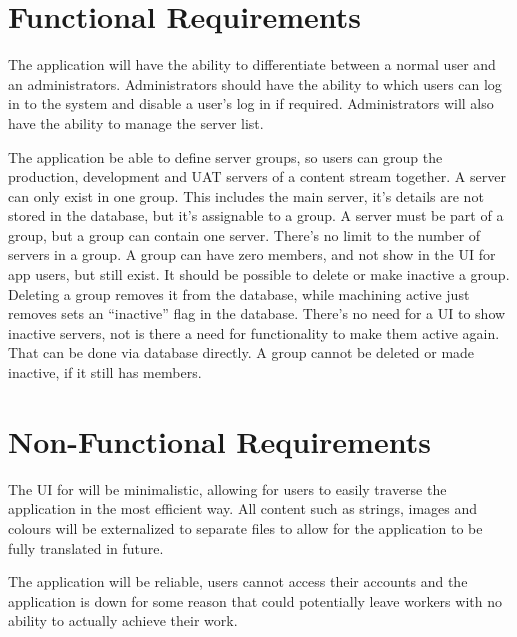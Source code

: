 \section{Functional Requirements}
The application will have the ability to differentiate between a normal user and an administrators. Administrators should have the ability to which users can log in to the system and disable a user's log in if required. Administrators will also have the ability to manage the server list.

The application be able to define server groups, so users can group the production, development and UAT servers of a content stream together. A server can only exist in one group. This includes the main server, it’s details are not stored in the database, but it’s assignable to a group. A server must be part of a group, but a group can contain one server. There’s no limit to the number of servers in a group. A group can have zero members, and not show in the UI for app users, but still exist. It should be possible to delete or make inactive a group. Deleting a group removes it from the database, while machining active just removes sets an “inactive” flag in the database. There’s no need for a UI to show inactive servers, not is there a need for functionality to make them active again. That can be done via database directly. A group cannot be deleted or made inactive, if it still has members. 

\pagebreak


\section{Non-Functional Requirements}
The UI for will be minimalistic, allowing for users to easily traverse the application in the most efficient way.  
All content such as strings, images and colours will be externalized to separate files to allow for the application to be fully translated in future. 

The application will be reliable, users cannot access their accounts and the application is down for some reason that could potentially leave workers with no ability to actually achieve their work.




